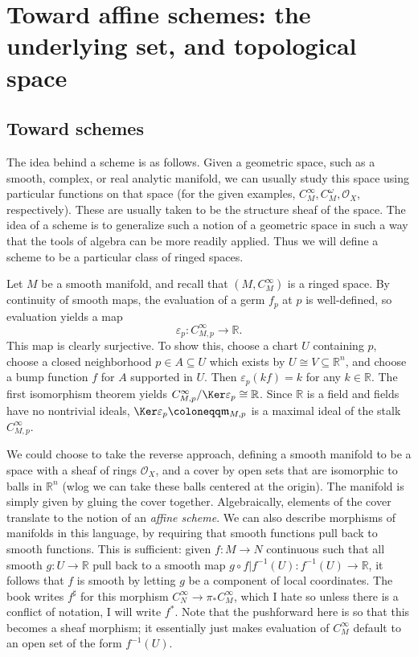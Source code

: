 \chapter{Toward affine schemes: the underlying set, and topological space}

\section{Toward schemes}

The idea behind a scheme is as follows. Given a geometric space, such as a smooth, complex, or real analytic manifold, we can usually study this space using particular functions on that space (for the given examples, $C^\infty _M,C^\omega _M,\mathcal{O} _X$, respectively). These are usually taken to be the structure sheaf of the space. The idea of a scheme is to generalize such a notion of a geometric space in such a way that the tools of algebra can be more readily applied. Thus we will define a scheme to be a particular class of ringed spaces.

\begin{example}\label{ex:3-1-1}
	Let $M$ be a smooth manifold, and recall that $(M,C^\infty _M)$ is a ringed space. By continuity of smooth maps, the evaluation of a germ $f_p$ at $p$ is well-defined, so evaluation yields a map
	\[
		\varepsilon _p : C^\infty _{M,p}  \to \mathbb{R} 
	.\]
	This map is clearly surjective. To show this, choose a chart $U$ containing $p$, choose a closed neighborhood $p\in A \subseteq U$ which exists by $U \cong V \subseteq \mathbb{R} ^n$, and choose a bump function $f$ for $A$ supported in $U$. Then $\varepsilon _p(kf)=k$ for any $k\in\mathbb{R} $. The first isomorphism theorem yields $C^\infty _{M,p} /\Ker \varepsilon _p \cong \mathbb{R} $. Since $\mathbb{R} $ is a field and fields have no nontrivial ideals, $\Ker \varepsilon _p \coloneqq \mathfrak{m}_{M,p} $ is a maximal ideal of the stalk $C^\infty _{M,p} $.

	We could choose to take the reverse approach, defining a smooth manifold to be a space with a sheaf of rings $\mathcal{O} _X$, and a cover by open sets that are isomorphic to balls in $\mathbb{R} ^n$ (wlog we can take these balls centered at the origin). The manifold is simply given by gluing the cover together. Algebraically, elements of the cover translate to the notion of an \emph{affine scheme}. We can also describe morphisms of manifolds in this language, by requiring that smooth functions pull back to smooth functions. This is sufficient: given $f : M \to N$ continuous such that all smooth $g : U \to \mathbb{R} $ pull back to a smooth map $g\circ f|f^{-1} (U): f^{-1} (U) \to \mathbb{R} $, it follows that $f$ is smooth by letting $g$ be a component of local coordinates. The book writes $f^{\sharp} $ for this morphism $C^\infty _N \to \pi _*C^\infty _M$, which I hate so unless there is a conflict of notation, I will write $f^*$. Note that the pushforward here is so that this becomes a sheaf morphism; it essentially just makes evaluation of $C^\infty _M$ default to an open set of the form $f^{-1} (U)$.
\end{example}

